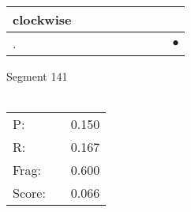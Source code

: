 \documentclass[landscape]{article}
\newcommand{\ssp}{\hspace{2pt}}
\newcommand{\mex}{\cellcolor{g}$\bullet$}
\begin{document}
\begin{tabular}{|l|p{10pt}|p{10pt}|p{10pt}|p{10pt}|p{10pt}|p{10pt}|p{10pt}|p{10pt}|}
\hline
\ssp clockwise \ssp&\hspace{2pt}&\hspace{2pt}&\hspace{2pt}&\hspace{2pt}&\hspace{2pt}&\hspace{2pt}&\hspace{2pt}&\hspace{2pt}\\
\hline
\ssp \cellcolor{ref7}. \ssp&\hspace{2pt}&\hspace{2pt}&\hspace{2pt}&\hspace{2pt}&\hspace{2pt}&\hspace{2pt}&\hspace{2pt}&\hspace{2pt}\mex\\
\hline
\end{tabular}

\vspace{6pt}
\noindent Segment 141\\\\
\noindent\begin{tabular}{lm{12pt}r}
\hline
P:&&0.150\\
R:&&0.167\\
Frag:&&0.600\\
Score:&&0.066\\
\end{tabular}

\newpage
\end{document}
